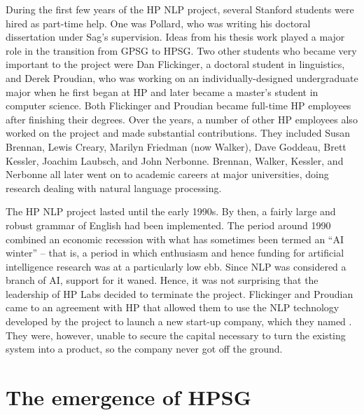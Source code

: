 \documentclass[output=paper]{langsci/langscibook}
\begin{document}
During the first few years of the HP NLP project, several Stanford students were hired as part-time help.   One was Pollard, who was writing his doctoral dissertation under Sag's supervision.  Ideas from his thesis work played a major role in the transition from GPSG to HPSG.  Two other students who became very important to the project were Dan Flickinger, a doctoral student in linguistics, and Derek Proudian, who was working on an individually-designed undergraduate major when he first began at HP and later became a master's student in computer science.  Both Flickinger and Proudian became full-time HP employees after finishing their degrees.   Over the years, a number of other HP employees also worked on the project and made substantial contributions.  They included Susan Brennan, Lewis Creary, Marilyn Friedman (now Walker), Dave Goddeau, Brett Kessler, Joachim Laubsch, and John Nerbonne.  Brennan, Walker, Kessler, and Nerbonne all later went on to academic careers at major universities, doing research dealing with natural language processing.

The HP NLP project lasted until the early 1990s.  By then, a fairly large and robust grammar of English had been implemented.  The period around 1990 combined an economic recession with what has sometimes been termed an ``AI winter'' -- that is, a period in which enthusiasm and hence funding for artificial intelligence research was at a particularly low ebb.  Since NLP was considered a branch of AI, support for it waned.  Hence, it was not surprising that the leadership of HP Labs decided to terminate the project.  Flickinger and Proudian came to an agreement with HP that allowed them to use the NLP technology developed by the project to launch a new start-up company, which they named .  They were, however, unable to secure the capital necessary to turn the existing system into a product, so the company never got off the ground.

\section{The emergence of HPSG}
\end{document}
